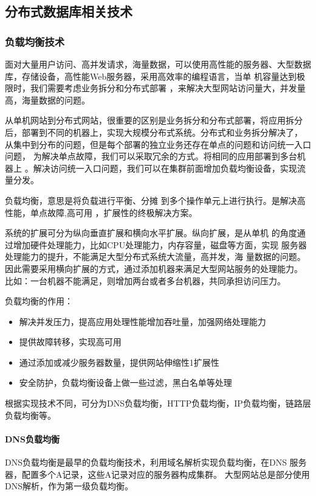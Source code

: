 \subsection{分布式数据库相关技术}
\subsubsection{负载均衡技术}
面对大量用户访问、高并发请求，海量数据，可以使用高性能的服务器、大型数据
库，存储设备，高性能Web服务器，采用高效率的编程语言，当单
机容量达到极限时，我们需要考虑业务拆分和分布式部署
，来解决大型网站访问量大，并发量高，海量数据的问题。

从单机网站到分布式网站，很重要的区别是业务拆分和分布式部署，将应用拆分
后，部署到不同的机器上，实现大规模分布式系统。分布式和业务拆分解决了，
从集中到分布的问题，但是每个部署的独立业务还存在单点的问题和访问统一入口问题，
为解决单点故障，我们可以采取冗余的方式。将相同的应用部署到多台机器上
。解决访问统一入口问题，我们可以在集群前面增加负载均衡设备，实现流量分发。

负载均衡，意思是将负载进行平衡、分摊
到多个操作单元上进行执行。是解决高性能，单点故障,高可用
，扩展性的终极解决方案。

系统的扩展可分为纵向垂直扩展和横向水平扩展。纵向扩展，是从单机
的角度通过增加硬件处理能力，比如CPU处理能力，内存容量，磁盘等方面，实现
服务器处理能力的提升，不能满足大型分布式系统大流量，高并发，海
量数据的问题。因此需要采用横向扩展的方式，通过添加机器来满足大型网站服务的处理能力。
比如：一台机器不能满足，则增加两台或者多台机器，共同承担访问压力。

负载均衡的作用：
\begin{itemize}
\item 解决并发压力，提高应用处理性能增加吞吐量，加强网络处理能力
\item 提供故障转移，实现高可用
\item 通过添加或减少服务器数量，提供网站伸缩性1扩展性
\item 安全防护，负载均衡设备上做一些过滤，黑白名单等处理
\end{itemize}

根据实现技术不同，可分为DNS负载均衡，HTTP负载均衡，IP负载均衡，链路层
负载均衡等。

\paragraph{DNS负载均衡}
DNS负载均衡是最早的负载均衡技术，利用域名解析实现负载均衡，在DNS
服务器，配置多个A记录，这些A记录对应的服务器构成集群。
大型网站总是部分使用DNS解析，作为第一级负载均衡。

